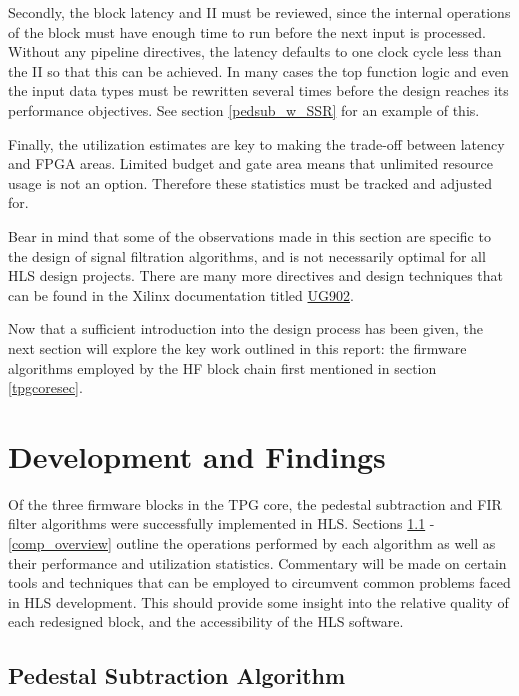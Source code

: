 \documentclass[10pt]{article}
\begin{document}
Secondly, the block latency and II must be reviewed, since the internal operations of the block must have enough time to run before the next input is processed. Without any pipeline directives, the latency defaults to one clock cycle less than the II so that this can be achieved. In many cases the top function logic and even the input data types must be rewritten several times before the design reaches its performance objectives. See section \ref{pedsub_w_SSR} for an example of this.

Finally, the utilization estimates are key to making the trade-off between latency and FPGA areas. Limited budget and gate area means that unlimited resource usage is not an option. Therefore these statistics must be tracked and adjusted for.

Bear in mind that some of the observations made in this section are specific to the design of signal filtration algorithms, and is not necessarily optimal for all HLS design projects. There are many more directives and design techniques that can be found in the Xilinx documentation titled \href{https://www.xilinx.com/support/documentation/sw_manuals/xilinx2018_3/ug902-vivado-high-level-synthesis.pdf}{UG902}\cite{vivado_design_suite_user_guide_2018}.

Now that a sufficient introduction into the design process has been given, the next section will explore the key work outlined in this report: the firmware algorithms employed by the HF block chain first mentioned in section \ref{tpgcoresec}.

\section{Development and Findings} \label{dev_and_find}

Of the three firmware blocks in the TPG core, the pedestal subtraction and FIR filter algorithms were successfully implemented in HLS. Sections \ref{pedsubalg} - \ref{comp_overview} outline the operations performed by each algorithm as well as their performance and utilization statistics. Commentary will be made on certain tools and techniques that can be employed to circumvent common problems faced in HLS development. This should provide some insight into the relative quality of each redesigned block, and the accessibility of the HLS software.

\subsection{Pedestal Subtraction Algorithm}\label{pedsubalg}
\end{document}
